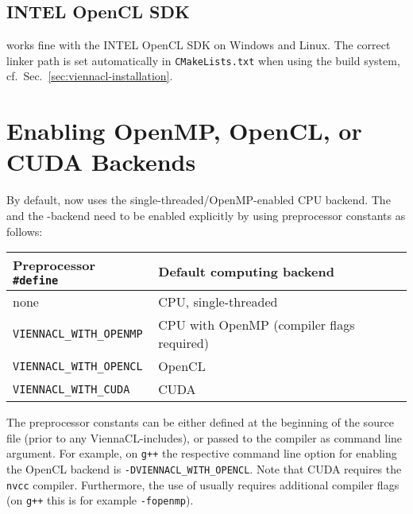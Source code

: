 \subsection{INTEL OpenCL SDK} \label{sec:opencl-on-intel}
 {\ViennaCL} works fine with the INTEL OpenCL SDK on Windows and Linux.
The correct linker path is set automatically in \lstinline|CMakeLists.txt| when using the {\CMake} build system, cf.~Sec.~\ref{sec:viennacl-installation}.

\section{Enabling OpenMP, OpenCL, or CUDA Backends} \label{sec:cuda-opencl-backends}


By default, {\ViennaCL} now uses the single-threaded/OpenMP-enabled CPU backend.
The {\OpenCL} and the {\CUDA}-backend need to be enabled explicitly by using preprocessor constants as follows:

\begin{center}
\begin{tabular}{|l|l|}
 \hline
   \textbf{Preprocessor} \lstinline|#define| & \textbf{Default computing backend} \\
 \hline
 none                              & CPU, single-threaded \\
 \hline
 \lstinline|VIENNACL_WITH_OPENMP|  & CPU with OpenMP (compiler flags required) \\
 \hline
 \lstinline|VIENNACL_WITH_OPENCL|  & OpenCL \\
 \hline
 \lstinline|VIENNACL_WITH_CUDA|  & CUDA \\
 \hline
\end{tabular}
\end{center}

The preprocessor constants can be either defined at the beginning of the source file (prior to any ViennaCL-includes), or passed to the compiler as command line argument.
For example, on \lstinline|g++| the respective command line option for enabling the OpenCL backend is \lstinline|-DVIENNACL_WITH_OPENCL|.
Note that CUDA requires the \lstinline|nvcc| compiler. Furthermore, the use of {\OpenMP} usually requires additional compiler flags (on \lstinline|g++| this is for example \lstinline|-fopenmp|).

